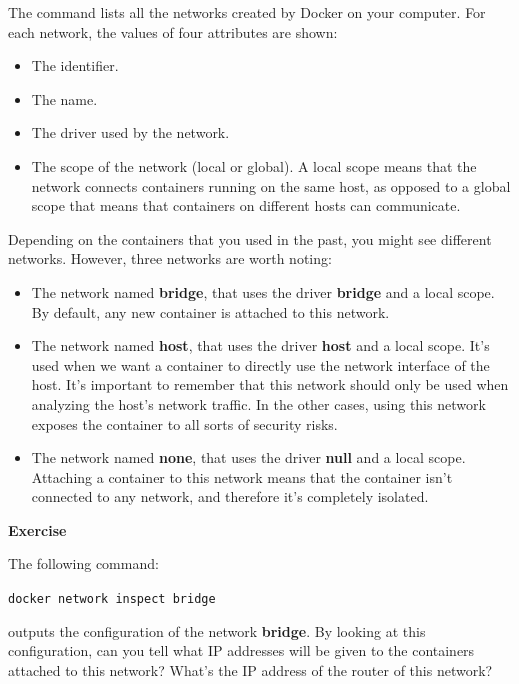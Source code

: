 \documentclass[
]{article}
\providecommand{\tightlist}{%
  \setlength{\itemsep}{0pt}\setlength{\parskip}{0pt}}
\newenvironment{infobox}[1]
  {
  \begin{itemize}
  \renewcommand{\labelitemi}{
    \raisebox{-.7\height}[0pt][0pt]{
      
    }
  }
  \setlength{\fboxsep}{1em}
  \begin{whitebox}
  \item
  }
  {
  \end{whitebox}
  \end{itemize}
  }
\theoremstyle{definition}
\theoremstyle{definition}
\theoremstyle{definition}
\theoremstyle{remark}
\let\BeginKnitrBlock\begin \let\EndKnitrBlock\end
\begin{document}
\begin{infobox}{exercisebox}

The command lists all the networks created by Docker on
your computer.
For each network, the values of four attributes are shown:

\begin{itemize}
\tightlist
\item
  The identifier.
\item
  The name.
\item
  The driver used by the network.
\item
  The scope of the network (local or global).
  A local scope means that the network connects containers
  running on the same host, as opposed to a global scope that
  means that containers on different hosts can communicate.
\end{itemize}

Depending on the containers that you used
in the past, you might see different networks.
However, three networks are worth noting:

\begin{itemize}
\tightlist
\item
  The network named \textbf{bridge}, that uses the driver \textbf{bridge} and a local scope.
  By default, any new container is attached to this network.
\item
  The network named \textbf{host}, that uses the driver \textbf{host} and a local scope.
  It's used when we want a container to directly use the network interface of the host.
  It's important to remember that this network should only be used when analyzing the
  host's network traffic. In the other cases, using this network exposes
  the container to all sorts of security risks.
\item
  The network named \textbf{none}, that uses the driver \textbf{null} and a local scope.
  Attaching a container to this network means that the container
  isn't connected to any network, and therefore it's completely isolated.
\end{itemize}

\end{infobox}

\begin{infobox}{exercisebox}

\textbf{Exercise}

\BeginKnitrBlock{exercise}
\label{exr:unnamed-chunk-30}{\label{exr:unnamed-chunk-30} }The following command:

\texttt{docker\ network\ inspect\ bridge}

outputs the configuration of the network \textbf{bridge}.
By looking at this configuration, can you tell
what IP addresses will be given to the containers attached to this
network? What's the IP address of the router of this network?
\EndKnitrBlock{exercise}

\end{infobox}
\end{document}

